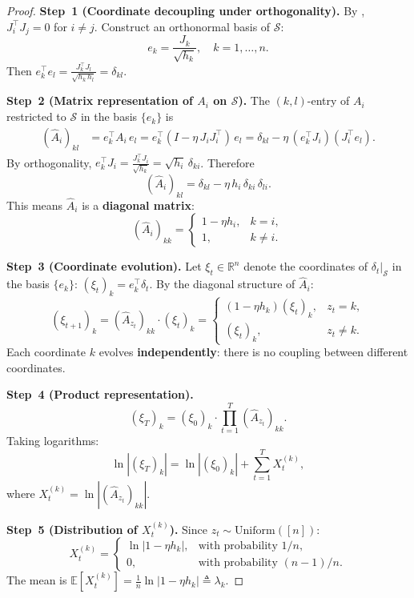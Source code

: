 \documentclass[11pt,a4paper]{article}
\theoremstyle{definition}
\theoremstyle{remark}
\newcommand{\R}{\mathbb{R}}
\newcommand{\E}{\mathbb{E}}
\newcommand{\cS}{\mathcal{S}}
\begin{document}
\begin{proof}
\textbf{Step~1 (Coordinate decoupling under orthogonality).}\;
By , $J_i^\top J_j = 0$ for $i \neq j$.
Construct an orthonormal basis of $\cS$:
\[
  e_k = \frac{J_k}{\sqrt{h_k}}, \quad k = 1, \ldots, n.
\]
Then $e_k^\top e_l = \frac{J_k^\top J_l}{\sqrt{h_k\, h_l}} = \delta_{kl}$.

\textbf{Step~2 (Matrix representation of $A_i$ on $\cS$).}\;
The $(k, l)$-entry of $A_i$ restricted to $\cS$ in the basis $\{e_k\}$ is
\begin{align*}
  (\hat{A}_i)_{kl}
  &= e_k^\top A_i\, e_l
  = e_k^\top(I - \eta\, J_i J_i^\top)\, e_l
  = \delta_{kl} - \eta\,(e_k^\top J_i)(J_i^\top e_l).
\end{align*}
By orthogonality, $e_k^\top J_i = \frac{J_k^\top J_i}{\sqrt{h_k}}
= \sqrt{h_i}\,\delta_{ki}$.  Therefore
\[
  (\hat{A}_i)_{kl} = \delta_{kl} - \eta\, h_i\,\delta_{ki}\,\delta_{li}.
\]
This means $\hat{A}_i$ is a \textbf{diagonal matrix}:
\[
  (\hat{A}_i)_{kk} =
  \begin{cases}
    1 - \eta h_i, & k = i, \\
    1, & k \neq i.
  \end{cases}
\]

\textbf{Step~3 (Coordinate evolution).}\;
Let $\xi_t \in \R^n$ denote the coordinates of $\delta_t|_{\cS}$ in the basis
$\{e_k\}$: $(\xi_t)_k = e_k^\top \delta_t$.  By the diagonal structure of
$\hat{A}_i$:
\[
  (\xi_{t+1})_k = (\hat{A}_{z_t})_{kk} \cdot (\xi_t)_k
  = \begin{cases}
    (1 - \eta h_k)(\xi_t)_k, & z_t = k, \\
    (\xi_t)_k, & z_t \neq k.
  \end{cases}
\]
Each coordinate $k$ evolves \textbf{independently}: there is no coupling between
different coordinates.

\textbf{Step~4 (Product representation).}\;
\[
  (\xi_T)_k = (\xi_0)_k \cdot \prod_{t=1}^{T} (\hat{A}_{z_t})_{kk}.
\]
Taking logarithms:
\[
  \ln|(\xi_T)_k| = \ln|(\xi_0)_k| + \sum_{t=1}^{T} X_t^{(k)},
\]
where $X_t^{(k)} = \ln|(\hat{A}_{z_t})_{kk}|$.

\textbf{Step~5 (Distribution of $X_t^{(k)}$).}\;
Since $z_t \sim \mathrm{Uniform}([n])$:
\[
  X_t^{(k)} =
  \begin{cases}
    \ln|1 - \eta h_k|, & \text{with probability } 1/n, \\
    0, & \text{with probability } (n-1)/n.
  \end{cases}
\]
The mean is
$\E[X_t^{(k)}] = \frac{1}{n}\ln|1 - \eta h_k| \triangleq \lambda_k$.


\end{proof}
\end{document}
